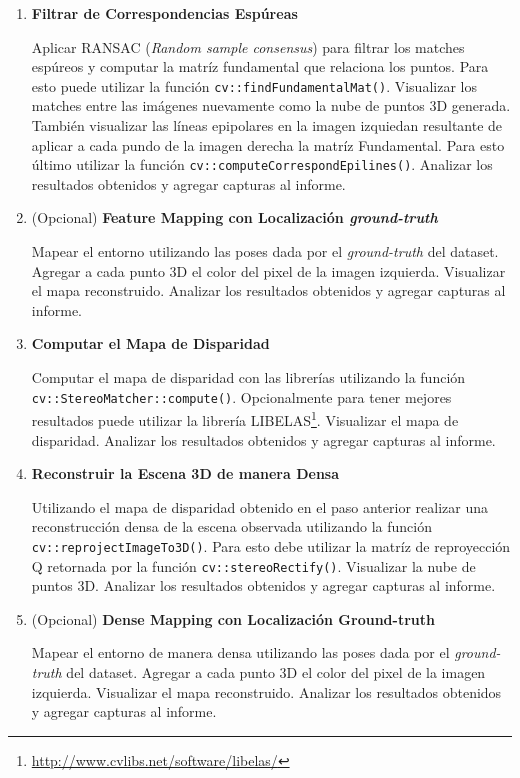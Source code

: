 \documentclass[tp]{lcc}
\begin{document}
\begin{enumerate}
\item \textbf{Filtrar de Correspondencias Espúreas} \label{ej:outlier_filtering}

Aplicar RANSAC (\emph{Random sample consensus}) para filtrar los matches espúreos y computar la matríz fundamental que relaciona los puntos. Para esto puede utilizar la función \lstinline{cv::findFundamentalMat()}. Visualizar los matches entre las imágenes nuevamente como la nube de puntos 3D generada. También visualizar las líneas epipolares en la imagen izquiedan resultante de aplicar a cada pundo de la imagen derecha la matríz Fundamental. Para esto último utilizar la función  \lstinline{cv::computeCorrespondEpilines()}. Analizar los resultados obtenidos y agregar capturas al informe.

\item (Opcional) \textbf{Feature Mapping con Localización \emph{ground-truth}}

Mapear el entorno utilizando las poses dada por el \emph{ground-truth} del dataset. Agregar a cada punto 3D el color del pixel de la imagen izquierda. Visualizar el mapa reconstruido.  Analizar los resultados obtenidos y agregar capturas al informe.

\item \textbf{Computar el Mapa de Disparidad}

Computar el mapa de disparidad con las librerías utilizando la función \lstinline{cv::StereoMatcher::compute()}. Opcionalmente para tener mejores resultados puede utilizar la librería LIBELAS\footnote{\url{http://www.cvlibs.net/software/libelas/}}. Visualizar el mapa de disparidad. Analizar los resultados obtenidos y agregar capturas al informe.

\item \textbf{Reconstruir la Escena 3D de manera Densa}

Utilizando el mapa de disparidad obtenido en el paso anterior realizar una reconstrucción densa de la escena observada utilizando la función \lstinline{cv::reprojectImageTo3D()}. Para esto debe utilizar la matríz de reproyección Q retornada por la función \lstinline{cv::stereoRectify()}. Visualizar la nube de puntos 3D. Analizar los resultados obtenidos y agregar capturas al informe.

\item (Opcional) \textbf{Dense Mapping con Localización Ground-truth}

Mapear el entorno de manera densa utilizando las poses dada por el \emph{ground-truth} del dataset. Agregar a cada punto 3D el color del pixel de la imagen izquierda. Visualizar el mapa reconstruido.  Analizar los resultados obtenidos y agregar capturas al informe.


\end{enumerate}
\end{document}
